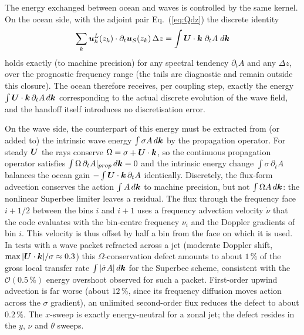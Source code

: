 \documentclass[12pt]{article}
\newcommand{\beq}  { \begin{eqnarray} }
\newcommand{\eeq}  { \end{eqnarray}}
\newcommand{\eq }  [1]{Eq.~(\ref{#1})}  %
\renewcommand{\v}[1]{{\mbox{\boldmath$ #1 $}}}  %
\newcommand{\p}{{\partial}}
\begin{document}
The energy exchanged between ocean and waves is controlled by the same
kernel. On the ocean side, with the adjoint pair \eq{eq:Qdz} the discrete
identity
\beq \label{eq:Cdisc}
 \sum_k \v u^L_h(z_k) \cdot \p_t \v u_S(z_k) \, \Delta z 
 = \int \v U \cdot \v k \; \p_t A \; d \v k
\eeq
holds exactly (to machine precision) for any spectral tendency $\p_t A$ and
any $\Delta z$, over the prognostic frequency range (the tails are diagnostic
and remain outside this closure). The ocean therefore receives, per coupling
step, exactly the energy $\int \v U \cdot \v k \, \p_t A \, d \v k$
corresponding to the actual discrete evolution of the wave field, and the
handoff itself introduces no discretisation error.

On the wave side, the counterpart of this energy must be extracted from (or
added to) the intrinsic wave energy $\int \sigma A \, d \v k$ by the
propagation operator. For steady $\v U$ the rays conserve $\Omega = \sigma +
\v U \cdot \v k$, so the continuous propagation operator satisfies $\int
\Omega \, \p_t A |_{prop} \, d \v k = 0$ and the intrinsic energy change $\int
\sigma \, \p_t A$ balances the ocean gain $-\int \v U \cdot \v k \, \p_t A$
identically. Discretely, the flux-form advection conserves the action $\int A
\, d\v k$ to machine precision, but not $\int \Omega A \, d \v k$: the
nonlinear Superbee limiter leaves a residual.
The flux through the frequency face $i+1/2$ between the bins $i$ and $i+1$
uses a frequency advection velocity $\dot \nu$ that the code evaluates with
the bin-centre frequency $\nu_i$ and the Doppler gradients of bin $i$.
This velocity is thus offset by half a bin from the face on which it is used. In tests with a wave packet refracted across a jet
(moderate Doppler shift, $\max |\v U \cdot \v k|/\sigma \approx 0.3$) this
$\Omega$-conservation defect amounts to about $1 \, \%$ of the gross local
transfer rate $\int |\dot \sigma A| \, d\v k$ for the Superbee scheme,
consistent with the $\mathcal{O}(0.5 \, \%)$ energy overshoot observed for such a
packet. First-order upwind advection is far worse (about
$12 \, \%$, since its frequency diffusion moves action across the $\sigma$
gradient), an unlimited second-order flux reduces the defect to about $0.2 \,
\%$. The $x$-sweep is exactly energy-neutral for a zonal jet; the defect
resides in the $y$, $\nu$ and $\theta$ sweeps.
\end{document}

